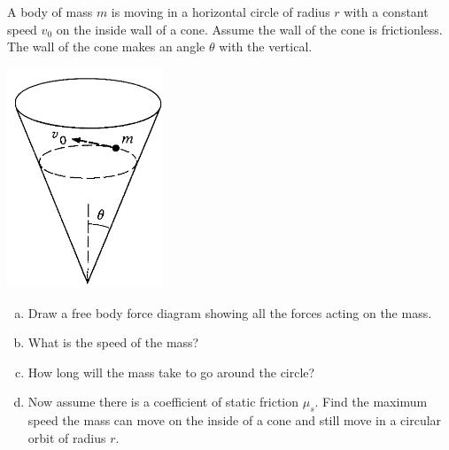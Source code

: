 \documentclass{esg8012pset}
\begin{document}
\begin{problem}[Problem 2.9]
  A body of mass $m$ is moving in a horizontal circle of radius $r$ with a constant speed $v_0$ on the inside wall of a cone. Assume the wall of the cone is frictionless. The wall of the cone makes an angle $\theta$ with the vertical.
  \begin{center}\includegraphics[width=0.35\textwidth]{ps02_3}\end{center}
  \begin{enumerate}[a)]
    \item Draw a free body force diagram showing all the forces acting on the mass.
    \item What is the speed of the mass?
    \item How long will the mass take to go around the circle?
    \item Now assume there is a coefficient of static friction $\mu_s$. Find the maximum speed the mass can move on the inside of a cone and still move in a circular orbit of radius $r$.
  \end{enumerate}
\end{problem}
\end{document}
